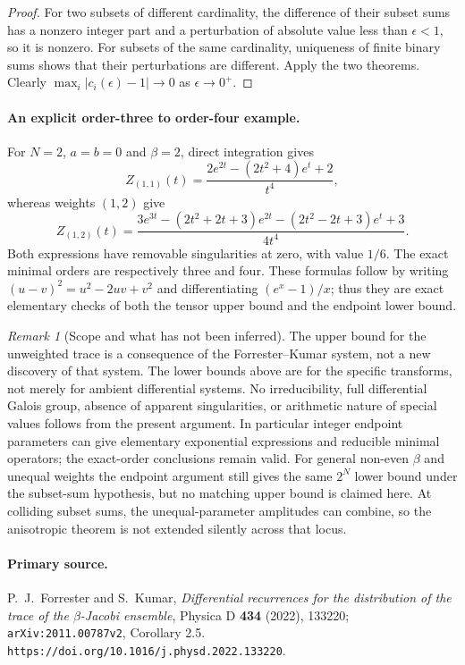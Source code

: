 \documentclass[11pt,a4paper]{article}
\theoremstyle{definition}
\theoremstyle{remark}
\newtheorem{remark}[theorem]{Remark}
\numberwithin{equation}{section}
\begin{document}
\begin{proof}
For two subsets of different cardinality, the difference of their
subset sums has a nonzero integer part and a perturbation of
absolute value less than $\epsilon<1$, so it is nonzero.  For
subsets of the same cardinality, uniqueness of finite binary sums
shows that their perturbations are different.  Apply the two
theorems.  Clearly $\max_i|c_i(\epsilon)-1|\to0$ as
$\epsilon\to0^+$.
\end{proof}

\paragraph{An explicit order-three to order-four example.}
For $N=2$, $a=b=0$ and $\beta=2$, direct integration gives
\[
 Z_{(1,1)}(t)
 =\frac{2e^{2t}-(2t^2+4)e^t+2}{t^4},
\]
whereas weights $(1,2)$ give
\[
 Z_{(1,2)}(t)
 =\frac{3e^{3t}-(2t^2+2t+3)e^{2t}
       -(2t^2-2t+3)e^t+3}{4t^4}.
\]
Both expressions have removable singularities at zero, with value
$1/6$.  The exact minimal orders are respectively three and four.
These formulas follow by writing $(u-v)^2=u^2-2uv+v^2$ and
differentiating $(e^x-1)/x$; thus they are exact elementary checks
of both the tensor upper bound and the endpoint lower bound.

\begin{remark}[Scope and what has not been inferred]
The upper bound for the unweighted trace is a consequence of the
Forrester--Kumar system, not a new discovery of that system.  The
lower bounds above are for the specific transforms, not merely
for ambient differential systems.  No irreducibility, full
differential Galois group, absence of apparent singularities, or
arithmetic nature of special values follows from the present
argument.  In particular integer endpoint parameters can give
elementary exponential expressions and reducible minimal operators;
the exact-order conclusions remain valid.  For general non-even
$\beta$ and unequal weights the endpoint argument still gives the
same $2^N$ lower bound under the subset-sum hypothesis, but no
matching upper bound is claimed here.  At colliding subset sums,
the unequal-parameter amplitudes can combine, so the anisotropic
theorem is not extended silently across that locus.
\end{remark}

\paragraph{Primary source.}
P.~J.~Forrester and S.~Kumar, \emph{Differential recurrences for the
distribution of the trace of the $\beta$-Jacobi ensemble},
Physica D \textbf{434} (2022), 133220;
\texttt{arXiv:2011.00787v2}, Corollary 2.5.
\texttt{https://doi.org/10.1016/j.physd.2022.133220}.
\end{document}
